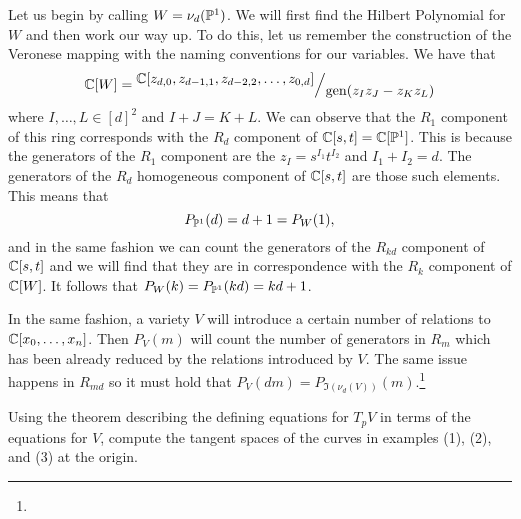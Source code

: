 \documentclass[12pt]{memoir}
\begin{document}
\begin{ptcbr}
Let us begin by calling $W=\nu_d(\mathbb{P}^1)$. We will first find the Hilbert Polynomial for $W$ and then work our way up. To do this, let us remember the construction of the Veronese mapping with the naming conventions for our variables. We have that 
$$\bC[W]=\quot{\bC[z_{d,0},z_{d-1,1},z_{d-2,2},\dots,z_{0,d}]}{\gen(z_Iz_J-z_Kz_L)}$$
where $I,\dots,L\in [d]^2$ and $I+J=K+L$. We can observe that the $R_1$ component of this ring corresponds with the $R_d$ component of $\mathbb{C}[s,t]=\mathbb{C}[\mathbb{P}^1]$. This is because the generators of the $R_1$ component are the $z_{I}=s^{I_1}t^{I_2}$ and $I_1+I_2=d$. The generators of the $R_d$ homogeneous component of $\mathbb{C}[s,t]$ are those such elements. This means that 
$$P_{\mathbb{P}^1}(d)=d+1=P_{W}(1),$$
and in the same fashion we can count the generators of the $R_{kd}$ component of $\mathbb{C}[s,t]$ and we will find that they are in correspondence with the $R_k$ component of $\mathbb{C}[W]$. It follows that $P_W(k)=P_{\mathbb{P}^1}(kd)=kd+1$.\par 
In the same fashion, a variety $V$ will introduce a certain number of relations to $\mathbb{C}[x_0,\dots,x_n]$. Then $P_V(m)$ will count the number of generators in $R_m$ which has been already reduced by the relations introduced by $V$. The same issue happens in $R_{md}$ so it must hold that $P_V(dm)=P_{\Im(\nu_d(V))}(m)$.\footnote{}
\end{ptcbr}

\begin{Ej}
	Using the theorem describing the defining equations for
	$T_pV$ in terms of the equations for $V$, compute the tangent spaces of the
	curves in examples (1), (2), and (3) at the origin.
\end{Ej}
\end{document}
